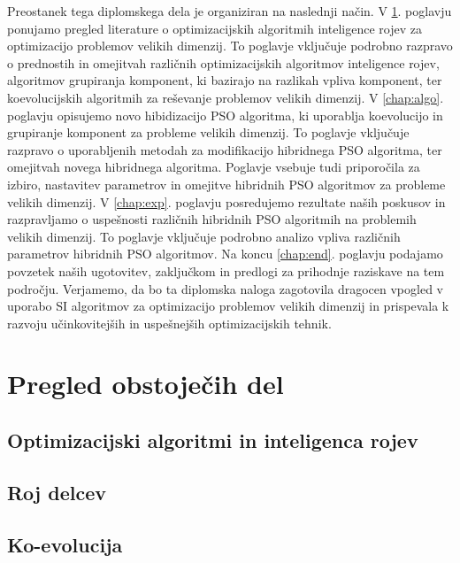 Preostanek tega diplomskega dela je organiziran na naslednji način.
V \ref{chap:obsojeca.dela}. poglavju ponujamo pregled literature o optimizacijskih algoritmih inteligence rojev za optimizacijo problemov velikih dimenzij.
To poglavje vključuje podrobno razpravo o prednostih in omejitvah različnih optimizacijskih algoritmov inteligence rojev, algoritmov grupiranja komponent, ki bazirajo na razlikah vpliva komponent, ter koevolucijskih algoritmih za reševanje problemov velikih dimenzij.
V \ref{chap:algo}. poglavju opisujemo novo hibidizacijo PSO algoritma, ki uporablja koevolucijo in grupiranje komponent za probleme velikih dimenzij.
To poglavje vključuje razpravo o uporabljenih metodah za modifikacijo hibridnega PSO algoritma, ter omejitvah novega hibridnega algoritma.
Poglavje vsebuje tudi priporočila za izbiro, nastavitev parametrov in omejitve hibridnih PSO algoritmov za probleme velikih dimenzij.
V \ref{chap:exp}. poglavju posredujemo rezultate naših poskusov in razpravljamo o uspešnosti različnih hibridnih PSO algoritmih na problemih velikih dimenzij.
To poglavje vključuje podrobno analizo vpliva različnih parametrov hibridnih PSO algoritmov.
Na koncu \ref{chap:end}. poglavju podajamo povzetek naših ugotovitev, zaključkom in predlogi za prihodnje raziskave na tem področju. Verjamemo, da bo ta diplomska naloga zagotovila dragocen vpogled v uporabo SI algoritmov za optimizacijo problemov velikih dimenzij in prispevala k razvoju učinkovitejših in uspešnejših optimizacijskih tehnik.

\chapter{Pregled obstoječih del}\label{chap:obsojeca.dela}


\section{Optimizacijski algoritmi in inteligenca rojev}


\section{Roj delcev}


\section{Ko-evolucija}

